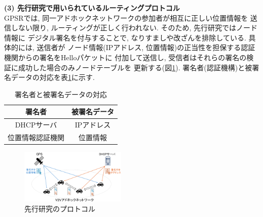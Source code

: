 \documentclass[a4j,9pt,twocolumn]{jsarticle}
\begin{document}
\noindent\textbf{(3) 先行研究で用いられているルーティングプロトコル}\\
\indent GPSRでは, 同一アドホックネットワークの参加者が相互に正しい位置情報を
送信しない限り, ルーティングが正しく行われない. そのため, 先行研究ではノード情報に
デジタル署名を付与することで, なりすましや改ざんを排除している. 具体的には, 送信者が
ノード情報(IPアドレス, 位置情報)の正当性を担保する認証機関からの署名をHelloパケットに
付加して送信し, 受信者はそれらの署名の検証に成功した場合のみノードテーブルを
更新する(図\ref{fig:introduce}). 
署名者(認証機構)と被署名データの対応を表\ref{tab:sign}に示す. 
\vspace{-3mm}
\begin{table}[h]
    \centering
    \caption{署名者と被署名データの対応\cite{shinato}}
    \label{tab:sign}
    \begin{tabular}{cc} \hline
        署名者 & 被署名データ \\ \hline \hline
        DHCPサーバ & IPアドレス \\
        位置情報認証機関 & 位置情報 \\ \hline
    \end{tabular}
\end{table}
\vspace{-5mm} %
\begin{figure}[h]
    \centering
    \includegraphics[width=0.45\textwidth]{figures/introduce.png}
    \caption{先行研究のプロトコル\cite{shinato}}
    \label{fig:introduce}
\end{figure}
\vspace{-5mm}
\end{document}
